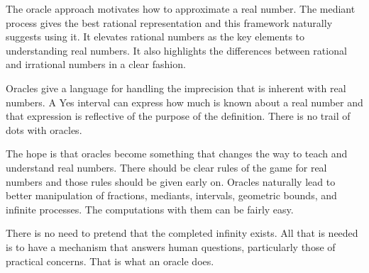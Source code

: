 \documentclass[12pt]{article}
\begin{document}
The oracle approach motivates how to approximate a real number. The mediant process gives the best rational representation and this framework naturally suggests using it. It elevates rational numbers as the key elements to understanding real numbers. It also highlights the differences between rational and irrational numbers in a clear fashion. 

Oracles give a language for handling the imprecision that is inherent with real numbers. A Yes interval can express how much is known about a real number and that expression is reflective of the purpose of the definition. There is no  trail of dots with oracles. 

The hope is that oracles become something that changes the way to teach and understand real numbers. There should be clear rules of the game for real numbers and those rules should be given early on. Oracles naturally lead to better manipulation of fractions, mediants, intervals, geometric bounds, and infinite processes. The computations with them can be fairly easy. 

There is no need to pretend that the completed infinity exists. All that is needed is to have a mechanism that answers human questions, particularly those of practical concerns. That is what an oracle does. 

\medskip

\printbibliography
\end{document}
